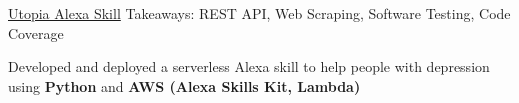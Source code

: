 \begin{cventries}
	\cventryprojects
    {\href{https://github.com/k-chuang/utopia-alexa-skill}{Utopia Alexa Skill}} %
    {Takeaways: REST API, Web Scraping, Software Testing, Code Coverage} %
    {
      \begin{cvitems} %
        \item {Developed and deployed a serverless Alexa skill to help people with depression using \textbf{Python} and \textbf{AWS (Alexa Skills Kit, Lambda)}}
      \end{cvitems}
    }




\end{cventries}
